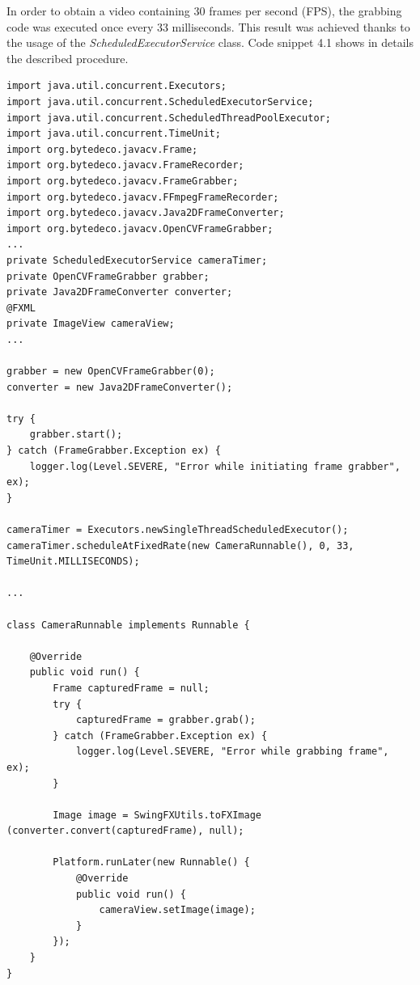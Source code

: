 \documentclass[binding=0.6cm,LaM]{sapthesis}
\begin{document}
In order to obtain a video containing 30 frames per second (FPS), the grabbing code was executed once every 33 milliseconds. This result was achieved thanks to the usage of the \textit{ScheduledExecutorService} class. Code snippet 4.1 shows in details the described procedure.
\\
\renewcommand{\lstlistingname}{Code snippet}
\begin{lstlisting}[caption={Camera input management}, captionpos=b]
import java.util.concurrent.Executors;
import java.util.concurrent.ScheduledExecutorService;
import java.util.concurrent.ScheduledThreadPoolExecutor;
import java.util.concurrent.TimeUnit;
import org.bytedeco.javacv.Frame;
import org.bytedeco.javacv.FrameRecorder;
import org.bytedeco.javacv.FrameGrabber;
import org.bytedeco.javacv.FFmpegFrameRecorder;
import org.bytedeco.javacv.Java2DFrameConverter;
import org.bytedeco.javacv.OpenCVFrameGrabber;
...
private ScheduledExecutorService cameraTimer;
private OpenCVFrameGrabber grabber;
private Java2DFrameConverter converter;
@FXML
private ImageView cameraView;
...

grabber = new OpenCVFrameGrabber(0);
converter = new Java2DFrameConverter();

try {
	grabber.start();
} catch (FrameGrabber.Exception ex) {
	logger.log(Level.SEVERE, "Error while initiating frame grabber", ex);
}

cameraTimer = Executors.newSingleThreadScheduledExecutor();
cameraTimer.scheduleAtFixedRate(new CameraRunnable(), 0, 33, TimeUnit.MILLISECONDS);

...
        
class CameraRunnable implements Runnable {

    @Override
    public void run() {
        Frame capturedFrame = null;
        try {
            capturedFrame = grabber.grab();
        } catch (FrameGrabber.Exception ex) {
            logger.log(Level.SEVERE, "Error while grabbing frame", ex);
        }

        Image image = SwingFXUtils.toFXImage (converter.convert(capturedFrame), null);  
            
        Platform.runLater(new Runnable() {
            @Override
            public void run() {
                cameraView.setImage(image);
            }
        });        
    }
}
        
\end{lstlisting}
\end{document}
